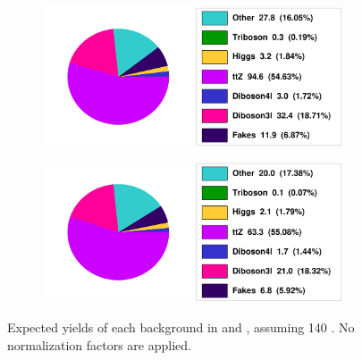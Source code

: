 \begin{figure}[tbp]
    \centering
    \begin{subfigure}[b]{0.49\textwidth}
      \centering
      \includegraphics[width=0.98\textwidth]{figs/rpvthreel/CRttZ_yields.png}
      \caption{}
      \label{fig:CRttZ_yields}
    \end{subfigure}
    \hfill
    \begin{subfigure}[b]{0.49\textwidth}
      \centering
      \includegraphics[width=0.98\textwidth]{figs/rpvthreel/VRttZ_yields.png}
      \caption{}
      \label{fig:VRttZ_yields}
    \end{subfigure}
  \caption[Expected yields of each background in \CRttZ and \VRttZ, assuming 140 \ifb. No normalization factors are applied.]
          {Expected yields of each background in \CRttZ and \VRttZ, assuming 140 \ifb. No normalization factors are applied.}
   \label{fig:ttZ_yields}
\end{figure}

